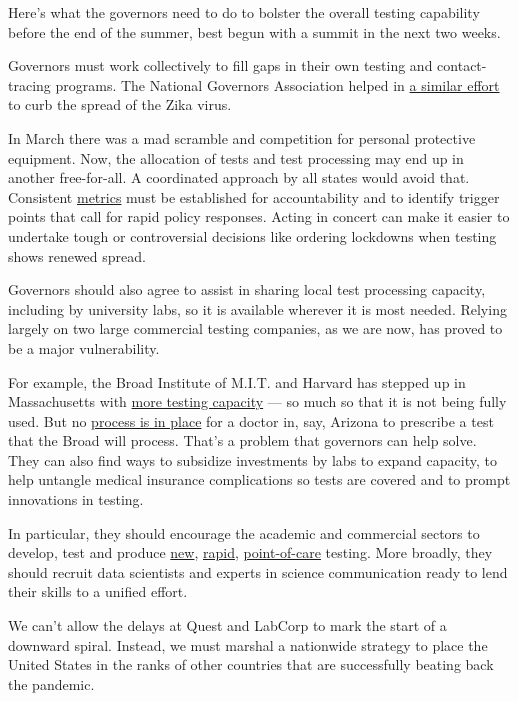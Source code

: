 Here's what the governors need to do to bolster the overall testing
capability before the end of the summer, best begun with a summit in the
next two weeks.

Governors must work collectively to fill gaps in their own testing and
contact-tracing programs. The National Governors Association helped in
\href{https://perma.cc/TC92-QCKG}{a similar effort} to curb the spread
of the Zika virus.

In March there was a mad scramble and competition for personal
protective equipment. Now, the allocation of tests and test processing
may end up in another free-for-all. A coordinated approach by all states
would avoid that. Consistent
\href{http://covid-local.org/metrics}{metrics} must be established for
accountability and to identify trigger points that call for rapid policy
responses. Acting in concert can make it easier to undertake tough or
controversial decisions like ordering lockdowns when testing shows
renewed spread.

Governors should also agree to assist in sharing local test processing
capacity, including by university labs, so it is available wherever it
is most needed. Relying largely on two large commercial testing
companies, as we are now, has proved to be a major vulnerability.

For example, the Broad Institute of M.I.T. and Harvard has stepped up in
Massachusetts with
\href{https://covid19-testing.broadinstitute.org/}{more testing
capacity} --- so much so that it is not being fully used. But no
\href{https://www.nytimes3xbfgragh.onion/2020/05/21/health/coronavirus-testing-lab-capacity.html}{process
is in place} for a doctor in, say, Arizona to prescribe a test that the
Broad will process. That's a problem that governors can help solve. They
can also find ways to subsidize investments by labs to expand capacity,
to help untangle medical insurance complications so tests are covered
and to prompt innovations in testing.

In particular, they should encourage the academic and commercial sectors
to develop, test and produce
\href{https://www.reuters.com/article/us-health-coronavirus-smiths-group/smiths-to-help-make-blood-based-coronavirus-test-in-britain-idUSKBN2491K0}{new},
\href{http://perma.cc/5DUZ-GUBV}{rapid},
\href{http://perma.cc/4V5X-B7CN}{point-of-care} testing. More broadly,
they should recruit data scientists and experts in science communication
ready to lend their skills to a unified effort.

We can't allow the delays at Quest and LabCorp to mark the start of a
downward spiral. Instead, we must marshal a nationwide strategy to place
the United States in the ranks of other countries that are successfully
beating back the pandemic.

